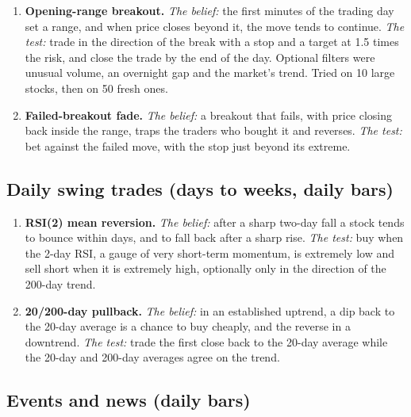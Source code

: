 \documentclass[11pt,a4paper]{article}
\providecommand{\tightlist}{\setlength{\itemsep}{0pt}\setlength{\parskip}{0pt}}
\begin{document}
\begin{enumerate}
\def\labelenumi{\arabic{enumi}.}
\tightlist
\item
  \textbf{Opening-range breakout.} \emph{The belief:} the first minutes of the trading day set a range, and when price closes beyond it,
  the move tends to continue. \emph{The test:} trade in the direction of the break with a stop and a target at 1.5 times the
  risk, and close the trade by the end of the day. Optional filters were unusual volume, an overnight gap and the market's
  trend. Tried on 10 large stocks, then on 50 fresh ones.
\item
  \textbf{Failed-breakout fade.} \emph{The belief:} a breakout that fails, with price closing back inside the range, traps the traders
  who bought it and reverses. \emph{The test:} bet against the failed move, with the stop just beyond its extreme.
\end{enumerate}

\subsection{Daily swing trades (days to weeks, daily bars)}\label{daily-swing-trades-days-to-weeks-daily-bars}

\begin{enumerate}
\def\labelenumi{\arabic{enumi}.}
\setcounter{enumi}{2}
\tightlist
\item
  \textbf{RSI(2) mean reversion.} \emph{The belief:} after a sharp two-day fall a stock tends to bounce within days, and to fall back
  after a sharp rise. \emph{The test:} buy when the 2-day RSI, a gauge of very short-term momentum, is extremely low and sell
  short when it is extremely high, optionally only in the direction of the 200-day trend.
\item
  \textbf{20/200-day pullback.} \emph{The belief:} in an established uptrend, a dip back to the 20-day average is a chance to buy
  cheaply, and the reverse in a downtrend. \emph{The test:} trade the first close back to the 20-day average while the
  20-day and 200-day averages agree on the trend.
\end{enumerate}

\subsection{Events and news (daily bars)}\label{events-and-news-daily-bars}
\end{document}
